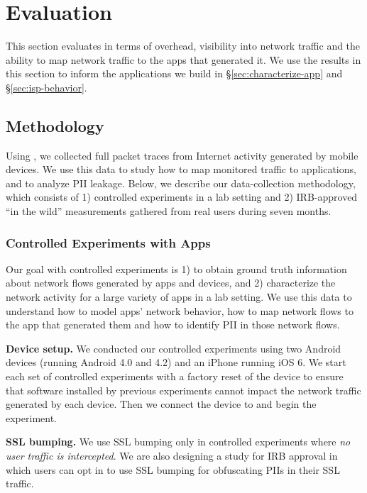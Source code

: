 \section{Evaluation}
\label{sec:eval}
This section evaluates \meddle in terms of overhead, visibility into network traffic and 
the ability to map network traffic to the apps that generated it. We use the results in 
this section to inform the applications we build in \S\ref{sec:characterize-app} and \S\ref{sec:isp-behavior}.

\subsection{Methodology}
\label{sec:dataset}
Using \platname, we collected full packet traces from Internet activity generated by
mobile devices. We use this data to study how to map monitored traffic to applications, and to
analyze PII leakage. Below, we describe our data-collection methodology, which consists of
1) controlled experiments in a lab setting and 2) IRB-approved ``in the wild'' measurements 
gathered from real users during seven months.


\subsubsection{Controlled Experiments with Apps}
\label{sec:dataset-contr-exper}
Our goal with controlled experiments is 1) to obtain ground truth information 
about network flows generated by apps and devices, and 2) characterize the 
network activity for a large variety of apps in a lab setting. We use 
this data to understand how to model apps' network behavior, how to map network flows 
to the app that generated them and how to identify PII in those network flows. 

\noindent\textbf{Device setup.} We conducted our controlled experiments using two Android 
devices (running Android 4.0 and 4.2) and an iPhone running iOS 6. We start each set of controlled experiments
 with a factory reset of the device to ensure that software installed by previous 
 experiments cannot impact the network traffic generated by each device. 
 Then we connect the device to \platname{}  and begin
the experiment. 


\noindent\textbf{SSL bumping.} 
We use SSL bumping only in controlled experiments where \emph{no user traffic is intercepted}.
We are also designing a study for IRB approval in which users can opt in to use SSL bumping for obfuscating PIIs in their SSL traffic.

